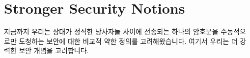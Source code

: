 \section{Stronger Security Notions}
지금까지 우리는 상대가 정직한 당사자들 사이에 전송되는 하나의 암호문을 수동적으로만 도청하는 보안에 대한
비교적 약한 정의를 고려해왔습니다. 여기서 우리는 더 강력한 보안 개념을 고려합니다.









